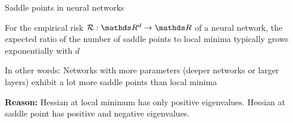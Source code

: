 \documentclass[11pt,compress,t,notes=noshow, xcolor=table]{beamer}
\begin{document}
\begin{framei}[sep=L]{Saddle points in neural networks}
\item For the empirical risk $\risk : \R^d \rightarrow \R$ of a neural network, the expected ratio of the number of saddle points to local minima typically grows exponentially with $d$
\item In other words: Networks with more parameters (deeper networks or larger layers) exhibit a lot more saddle points than local minima
\item \textbf{Reason:} Hessian at local minimum has only positive eigenvalues.
Hessian at saddle point has positive and negative eigenvalues.
\end{framei}

\endlecture
\end{document}
